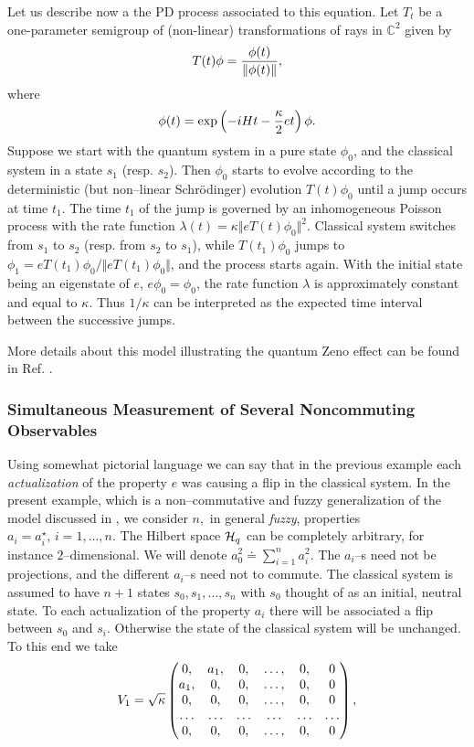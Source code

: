 \documentclass[12pt]{article}
\def\complex{{\mathbb C}}
\def\be{\begin{equation}} \def\ee{\end{equation}}
\begin{document}
Let us describe now a the PD process associated to this equation. 
Let
$T_t$ be a one-parameter semigroup of  (non-linear) transformations of
rays in
$\complex^2$ given by
\be T (t)\phi  ={\phi  (t) \over \Vert \phi  (t) \Vert}, 
\ee where
\be
\phi  (t)=\exp\left ({-iHt-{\kappa\over 2}et}\right)
\phi . 
\ee    Suppose we start with the quantum system in a pure state
$\phi_0$,  and  the classical system in a state
$s_1$  (resp.  $s_2$).  Then $\phi_0$ starts to evolve according to the
deterministic  (but non--linear Schr\"odinger) evolution $T (t)\phi_0 $ until a
jump occurs at time $t_1$.  The time $t_1$ of the jump is governed by
an inhomogeneous Poisson process with the rate function
$\lambda  (t) = \kappa \Vert e T (t)\phi_0 \Vert^2$.  Classical system
switches from $s_1$ to $s_2$  (resp.  from $s_2$ to $s_1$),  while  
$T (t_1)\phi_0$ jumps to
$\phi_1=eT (t_1)\phi_0/\Vert eT (t_1)\phi_0 \Vert$,  
and the process starts again.  With the initial
state being an eigenstate of $e$,  $e\phi_0=\phi_0$,  the rate
function $\lambda$ is approximately constant and equal to $\kappa$. 
Thus
${1/\kappa}$ can be interpreted as the expected time interval between
the successive jumps.

More details about this model illustrating the quantum Zeno effect
can be found in Ref.  \cite{bla2}. 
\subsubsection{Simultaneous Measurement of Several Noncommuting Observables}

Using somewhat pictorial language we can say that in the previous
example each {\em actualization} of the property
 $e$ was causing a flip in the classical system.  In the present
example,  which is a non--commutative and fuzzy generalization of the model 
discussed in \cite{bla1},  we
consider
$n , $   in general {\em fuzzy},  properties
$a_i=a_i^\star , \,  i=1, \ldots , n. $ 
The Hilbert space ${\cal H}_q$ can be completely arbitrary, 
for instance $2$--dimensional.    We will
denote
$a_0^2\doteq\sum_{i=1}^n a_i^2 . $ The 
$a_i$--s need not be projections,  and the different $a_i$--s 
need not to commute.   The classical system
is assumed to have
$n+1$ states
$s_0, s_1, \ldots , s_n$ with $s_0$ thought of as an initial,  
neutral state. 
  To
each actualization of the property $a_i$ there will be associated a
flip between
$s_0$ and
$s_i . $  Otherwise
the state of the classical system will be unchanged.  To this end we
take 
$$V_{1} ={\sqrt\kappa}
 \begin{pmatrix}0,     & a_{1} ,  &0 ,  &\ldots ,  &0 ,    
&0
\cr
                   a_{1}, & 0     ,  &0 ,  &\ldots ,  &0 ,     &0 \cr
                   0,    & 0     ,  &0 ,  &\ldots ,  &0 ,     &0\cr
\ldots&\ldots   &\ldots&\ldots &\ldots&\ldots\cr
                   0    , & 0     ,  &0 ,  &\ldots ,  &0 ,    &0\end{pmatrix} , $$
\end{document}
